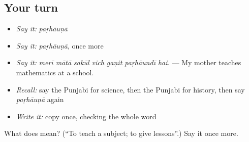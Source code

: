 \subsection*{Your turn}
\begin{itemize}
\raggedright
  \item \emph{Say it:} \emph{paṛhāuṇā}
  \item \emph{Say it:} \emph{paṛhāuṇā}, once more
  \item \emph{Say it:} \emph{merī mātā sakūl vich gaṇit paṛhāundī hai.} — My mother teaches mathematics at a school.
  \item \emph{Recall:} say the Punjabi for science, then the Punjabi for history, then say \emph{paṛhāuṇā} again
  \item \emph{Write it:} copy \textbf{} once, checking the whole word
\end{itemize}

\begin{tcolorbox}[breakable,colback=teal!4,colframe=teal!35!black,title={Before you move on}]
What does  mean? (\textquotedblleft{}To teach a subject; to give lessons\textquotedblright{}.) Say it once more.
\end{tcolorbox}
